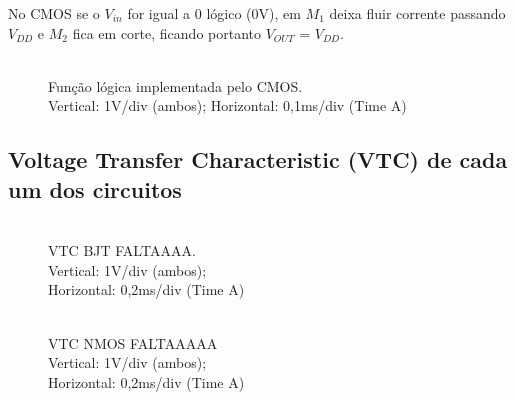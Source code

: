 \documentclass[pdftex,12pt,a4paper]{report}
\begin{document}
No CMOS se o $V_{in}$ for igual a 0 lógico (0V), em $M_1$ deixa fluir corrente passando $V_{DD}$ e $M_2$ fica em corte, ficando portanto $V_{OUT}$ = $V_{DD}$.

\begin{figure}[h]
  \centerline{}
  \caption{\\Função lógica implementada pelo CMOS. \\Vertical: 1V/div (ambos); Horizontal: 0,1ms/div (Time A)}\label{cmos}
\end{figure}

\newpage
\subsection{Voltage Transfer Characteristic (VTC) de cada um dos circuitos}
\begin{figure}[!htb]
  \centerline{}
  \caption{\\VTC BJT FALTAAAA. \\Vertical: 1V/div (ambos); \\Horizontal: 0,2ms/div (Time A)}\label{bjt}
\endminipage\hfill
{}
  \centerline{}
  \caption{\\VTC NMOS FALTAAAAA \\Vertical: 1V/div (ambos); \\Horizontal: 0,2ms/div (Time A)}\label{fig:nmos}
\endminipage\hfill
\end{figure}
\end{document}
